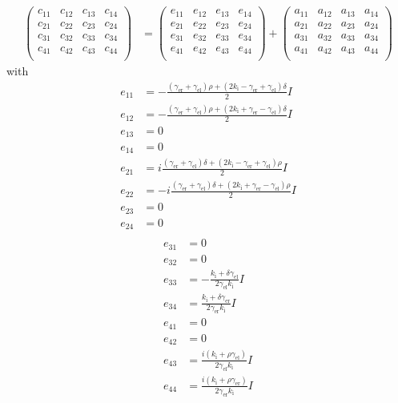 \begin{align*}
  \begin{pmatrix}
    c_{11} & c_{12} & c_{13} & c_{14} \\
    c_{21} & c_{22} & c_{23} & c_{24} \\
    c_{31} & c_{32} & c_{33} & c_{34} \\
    c_{41} & c_{42} & c_{43} & c_{44} \\
  \end{pmatrix} &=
  \begin{pmatrix}
    e_{11} & e_{12} & e_{13} & e_{14} \\
    e_{21} & e_{22} & e_{23} & e_{24} \\
    e_{31} & e_{32} & e_{33} & e_{34} \\
    e_{41} & e_{42} & e_{43} & e_{44} \\
  \end{pmatrix} + 
  \begin{pmatrix}
    a_{11} & a_{12} & a_{13} & a_{14} \\
    a_{21} & a_{22} & a_{23} & a_{24} \\
    a_{31} & a_{32} & a_{33} & a_{34} \\
    a_{41} & a_{42} & a_{43} & a_{44} \\
  \end{pmatrix} 
\end{align*}
with
\begin{align*}
  e_{11} &= -\frac{(\gamma_\text{er}+\gamma_\text{el}) \rho+ (2k_\text{i}-\gamma_\text{er}+\gamma_\text{el})\delta}{2}I\\
  e_{12} &= -\frac{(\gamma_\text{er}+\gamma_\text{el}) \rho+ (2k_\text{i}+\gamma_\text{er}-\gamma_\text{el})\delta}{2}I\\
  e_{13} &= 0\\
  e_{14} &= 0\\
  e_{21} &= i\frac{(\gamma_\text{er}+\gamma_\text{el})\delta + (2k_\text{i}-\gamma_\text{er}+\gamma_\text{el})\rho}{2} I \\
  e_{22} &= -i\frac{(\gamma_\text{er}+\gamma_\text{el})\delta + (2 k_\text{i} + \gamma_\text{er} -\gamma_\text{el})\rho}{2} I\\
  e_{23} &= 0\\
  e_{24} &= 0\\
\end{align*}
\begin{align*}
  e_{31} &= 0 \\
  e_{32} &= 0 \\
  e_{33} &= -\frac{k_\text{i}+\delta \gamma_\text{el}}{2 \gamma_\text{el} k_\text{i}} I\\
  e_{34} &= \frac{k_\text{i}+\delta \gamma_\text{er}}{2 \gamma_\text{er} k_\text{i}} I \\
  e_{41} &= 0\\
  e_{42} &= 0\\
  e_{43} &= \frac{i(k_\text{i} + \rho\gamma_\text{el})}{2 \gamma_\text{el} k_\text{i}} I  \\
  e_{44} &= \frac{i(k_\text{i} + \rho\gamma_\text{er})}{2 \gamma_\text{er} k_\text{i}} I\\ 
\end{align*}

